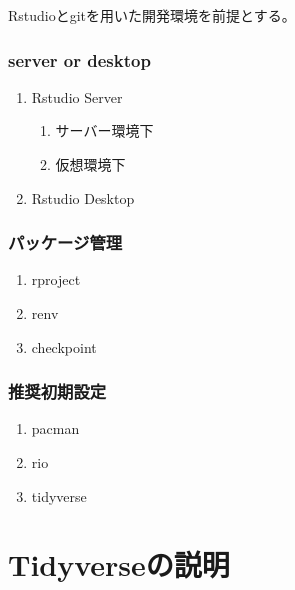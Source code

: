 \documentclass[
  letterpaper,
  DIV=11,
  numbers=noendperiod]{scrreprt}
\providecommand{\tightlist}{%
  \setlength{\itemsep}{0pt}\setlength{\parskip}{0pt}}\usepackage{longtable,booktabs,array}
\begin{document}
Rstudioとgitを用いた開発環境を前提とする。

\hypertarget{server-or-desktop}{%
\subsection{server or desktop}\label{server-or-desktop}}

\begin{enumerate}
\def\labelenumi{\arabic{enumi}.}
\tightlist
\item
  Rstudio Server

  \begin{enumerate}
  \def\labelenumii{\arabic{enumii}.}
  \tightlist
  \item
    サーバー環境下
  \item
    仮想環境下
  \end{enumerate}
\item
  Rstudio Desktop
\end{enumerate}

\hypertarget{ux30d1ux30c3ux30b1ux30fcux30b8ux7ba1ux7406}{%
\subsection{パッケージ管理}\label{ux30d1ux30c3ux30b1ux30fcux30b8ux7ba1ux7406}}

\begin{enumerate}
\def\labelenumi{\arabic{enumi}.}
\tightlist
\item
  rproject
\item
  renv
\item
  checkpoint
\end{enumerate}

\hypertarget{ux63a8ux5968ux521dux671fux8a2dux5b9a}{%
\subsection{推奨初期設定}\label{ux63a8ux5968ux521dux671fux8a2dux5b9a}}

\begin{enumerate}
\def\labelenumi{\arabic{enumi}.}
\tightlist
\item
  pacman
\item
  rio
\item
  tidyverse
\end{enumerate}


\hypertarget{tidyverseux306eux8aacux660e}{%
\chapter{Tidyverseの説明}\label{tidyverseux306eux8aacux660e}}
\end{document}
